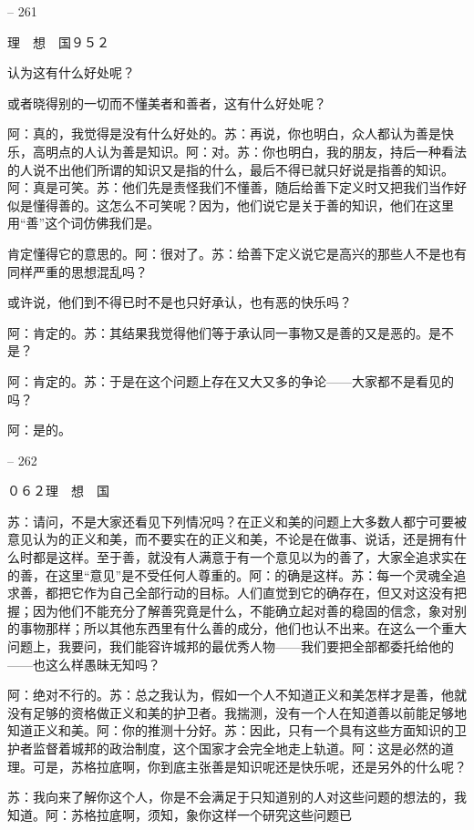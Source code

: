 \documentclass[11pt,oneside]{book}
\begin{document}
\begin{common-format}
    

-- 261

    理　想　国９５２

    认为这有什么好处呢？

    或者晓得别的一切而不懂美者和善者，这有什么好处呢？

    阿：真的，我觉得是没有什么好处的。苏：再说，你也明白，众人都认为善是快乐，高明点的人认为善是知识。阿：对。苏：你也明白，我的朋友，持后一种看法的人说不出他们所谓的知识又是指的什么，最后不得已就只好说是指善的知识。阿：真是可笑。苏：他们先是责怪我们不懂善，随后给善下定义时又把我们当作好似是懂得善的。这怎么不可笑呢？因为，他们说它是关于善的知识，他们在这里用“善”这个词仿佛我们是。

    肯定懂得它的意思的。阿：很对了。苏：给善下定义说它是高兴的那些人不是也有同样严重的思想混乱吗？

    或许说，他们到不得已时不是也只好承认，也有恶的快乐吗？

    阿：肯定的。苏：其结果我觉得他们等于承认同一事物又是善的又是恶的。是不是？

    阿：肯定的。苏：于是在这个问题上存在又大又多的争论——大家都不是看见的吗？

    阿：是的。

    

-- 262

    ０６２理　想　国

    苏：请问，不是大家还看见下列情况吗？在正义和美的问题上大多数人都宁可要被意见认为的正义和美，而不要实在的正义和美，不论是在做事、说话，还是拥有什么时都是这样。至于善，就没有人满意于有一个意见以为的善了，大家全追求实在的善，在这里“意见”是不受任何人尊重的。阿：的确是这样。苏：每一个灵魂全追求善，都把它作为自己全部行动的目标。人们直觉到它的确存在，但又对这没有把握；因为他们不能充分了解善究竟是什么，不能确立起对善的稳固的信念，象对别的事物那样；所以其他东西里有什么善的成分，他们也认不出来。在这么一个重大问题上，我要问，我们能容许城邦的最优秀人物——我们要把全部都委托给他的——也这么样愚昧无知吗？

    阿：绝对不行的。苏：总之我认为，假如一个人不知道正义和美怎样才是善，他就没有足够的资格做正义和美的护卫者。我揣测，没有一个人在知道善以前能足够地知道正义和美。阿：你的推测十分好。苏：因此，只有一个具有这些方面知识的卫护者监督着城邦的政治制度，这个国家才会完全地走上轨道。阿：这是必然的道理。可是，苏格拉底啊，你到底主张善是知识呢还是快乐呢，还是另外的什么呢？

    苏：我向来了解你这个人，你是不会满足于只知道别的人对这些问题的想法的，我知道。阿：苏格拉底啊，须知，象你这样一个研究这些问题已


\end{common-format}
\end{document}
